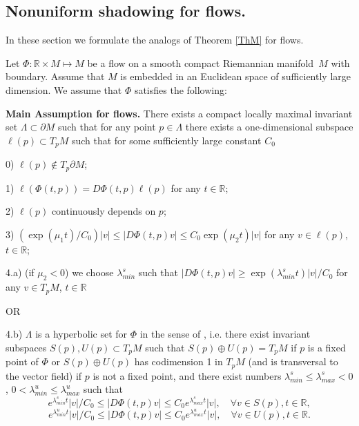 \documentclass[11pt]{article}
\theoremstyle{Mystyle}
\begin{document}
%

\subsection{Nonuniform shadowing for flows.}

In these section we formulate the analogs of Theorem \ref{ThM} for flows.

Let $\Phi:\mathbb{R}\times M\mapsto M$ be a flow on a smooth compact Riemannian manifold~$M$ with boundary. Assume that $M$ is embedded in an Euclidean space of sufficiently large dimension. 
We assume that $\Phi$ satisfies the following:

\textbf{Main Assumption for flows.}
There exists a compact locally maximal invariant set $\Lambda\subset \partial M$ such that
for any point $p\in\Lambda$ there exists a one-dimensional subspace $\ell(p)\subset T_{p}M$ such that for some sufficiently large constant $C_0$

0) $\ell(p)\notin T_{p}\partial M$;

1) $\ell(\Phi(t,p)) = D\Phi(t,p)\ell(p)$ for any $t\in\mathbb{R}$; 

2) $\ell(p)$ continuously depends on $p$; 

3) $(\exp(\mu_1 t)/C_0)|v|\leq |D\Phi(t,p)v|\leq C_0\exp(\mu_2 t)|v|$ for any $v\in\ell(p)$, $t\in\mathbb{R}$;

4.a) (if $\mu_2<0$) we choose $\lambda^{s}_{min}$ such that $|D\Phi(t,p)v|\geq\exp(\lambda^{s}_{min}t)|v|/C_{0}$ for any $v\in T_{p}M$, $t\in\mathbb{R}$

OR

4.b) $\Lambda$ is a hyperbolic set for $\Phi$ in the sense of \cite{Pil}, i.e. there exist invariant subspaces $S(p), U(p)\subset T_{p}M$ such that $S(p)\oplus U(p) = T_{p}M$ if $p$ is a fixed point of $\Phi$ or $S(p)\oplus U(p)$ has codimension 1 in $T_{p}M$ (and is transversal to the vector field) if $p$ is not a fixed point, and there exist numbers $\lambda^{s}_{min}\leq\lambda^{s}_{max}<0$, $0<\lambda^{u}_{min}\leq\lambda^{u}_{max}$ such that
$$e^{\lambda^{s}_{min}t}|v|/C_0\leq |D\Phi(t,p)v|\leq C_0 e^{\lambda^{s}_{max}t}|v|,\quad\forall v\in S(p), t\in\mathbb{R},$$
$$e^{\lambda^{u}_{min}t}|v|/C_0\leq |D\Phi(t,p)v|\leq C_0 e^{\lambda^{u}_{max}t}|v|,\quad\forall v\in U(p), t\in\mathbb{R}.$$
 
\end{document}
